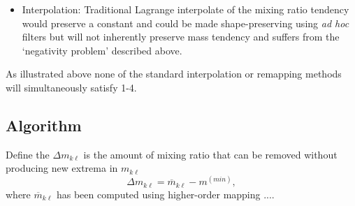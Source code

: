 \begin{itemize}





\item Interpolation: Traditional Lagrange interpolate of the mixing ratio tendency would preserve a constant and could be made shape-preserving using {\em{ad hoc}} filters \citep[e.g.][]{BC2002MWR} but will not inherently preserve mass tendency and suffers from the `negativity problem' described above.
\end{itemize}
As illustrated above none of the standard interpolation or remapping methods will simultaneously satisfy 1-4.
\subsection{Algorithm}
{\color{red}{mention that the reason we map tendency and not state is to avoid spurious tendencies solely due to interpolation errors, i.e. zero tendency on physics grid would transform into tendencies on the CSLAM grid.}}
Define the $\Delta m_{k\ell}$ is the amount of mixing ratio that can be removed without producing new extrema in $m_{k\ell}$
\begin{equation}
\Delta m_{k\ell}=\overline{m}_{k\ell}-m^{(min)},
\end{equation}
where $\overline{m}_{k\ell}$ has been computed using higher-order mapping ....
{\color{red}{mention why the problem is well-posed}}
